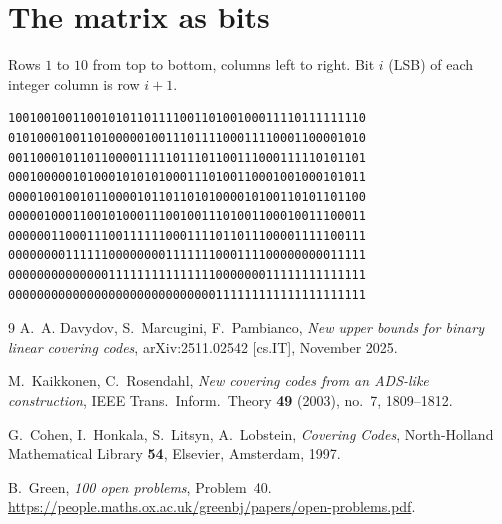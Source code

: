 \documentclass[11pt,a4paper]{article}
\begin{document}
\appendix
\section{The matrix as bits}

Rows $1$ to $10$ from top to bottom, columns left to right. Bit $i$
(LSB) of each integer column is row $i+1$.

{\small
\begin{verbatim}
10010010011001010110111100110100100011110111111110
01010001001101000001001110111100011110001100001010
00110001011011000011111011101100111000111110101101
00010000010100010101010001110100110001001000101011
00001001001011000010110110101000010100110101101100
00000100011001010001110010011101001100010011100011
00000011000111001111110001111011011100001111100111
00000000111111000000001111111000111100000000011111
00000000000000111111111111111000000011111111111111
00000000000000000000000000000111111111111111111111
\end{verbatim}
}

\begin{thebibliography}{9}
A.~A. Davydov, S.~Marcugini, F.~Pambianco,
\emph{New upper bounds for binary linear covering codes},
arXiv:2511.02542 [cs.IT], November 2025.

M.~Kaikkonen, C.~Rosendahl,
\emph{New covering codes from an ADS-like construction},
IEEE Trans.\ Inform.\ Theory \textbf{49} (2003), no.~7, 1809--1812.

G.~Cohen, I.~Honkala, S.~Litsyn, A.~Lobstein,
\emph{Covering Codes}, North-Holland Mathematical Library \textbf{54},
Elsevier, Amsterdam, 1997.

B.~Green, \emph{100 open problems}, Problem~40.
\url{https://people.maths.ox.ac.uk/greenbj/papers/open-problems.pdf}.
\end{thebibliography}
\end{document}
